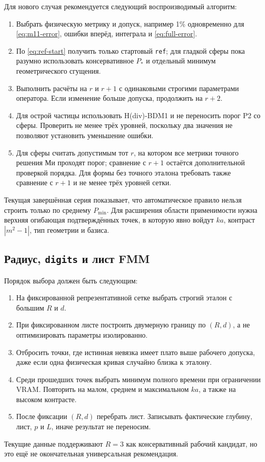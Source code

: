 \documentclass[12pt,a4paper]{article}
\begin{document}
Для нового случая рекомендуется следующий воспроизводимый алгоритм:
\begin{enumerate}
  \item Выбрать физическую метрику и допуск, например 1\% одновременно для
        \eqref{eq:m11-error}, ошибки вперёд, интеграла и \eqref{eq:full-error}.
  \item По \eqref{eq:ref-start} получить только стартовый \texttt{ref}; для
        гладкой сферы пока разумно использовать консервативное $P_*$ и отдельный
        минимум геометрического сгущения.
  \item Выполнить расчёты на $r$ и $r+1$ с одинаковыми строгими параметрами
        оператора. Если изменение больше допуска, продолжить на $r+2$.
  \item Для острой частицы использовать H(div)-BDM1 и не переносить порог P2
        со сферы. Проверить не менее трёх уровней, поскольку два значения не
        позволяют установить уменьшение ошибки.
  \item Для сферы считать допустимым тот $r$, на котором все метрики точного
        решения Ми проходят порог; сравнение с $r+1$ остаётся дополнительной
        проверкой порядка. Для формы без точного эталона требовать также
        сравнение с $r+1$ и не менее трёх уровней сетки.
\end{enumerate}

Текущая завершённая серия показывает, что автоматическое правило нельзя
строить только по среднему $P_{\min}$. Для расширения области применимости
нужна верхняя огибающая подтверждённых точек, в которую явно войдут $ka$,
контраст $|m^2-1|$, тип геометрии и базиса.

\subsection{Радиус, \texttt{digits} и лист FMM}

Порядок выбора должен быть следующим:
\begin{enumerate}
  \item На фиксированной репрезентативной сетке выбрать строгий эталон с
        большим $R$ и $d$.
  \item При фиксированном листе построить двумерную границу по $(R,d)$, а не
        оптимизировать параметры изолированно.
  \item Отбросить точки, где истинная невязка имеет плато выше рабочего
        допуска, даже если одна физическая кривая случайно близка к эталону.
  \item Среди прошедших точек выбрать минимум полного времени при ограничении
        VRAM. Повторить на малом, среднем и максимальном $ka$, а также на
        высоком контрасте.
  \item После фиксации $(R,d)$ перебрать лист. Записывать фактические глубину,
        лист, $p$ и $L$, иначе результат не переносим.
\end{enumerate}
Текущие данные поддерживают $R=3$ как консервативный рабочий кандидат, но это
ещё не окончательная универсальная рекомендация.
\end{document}
